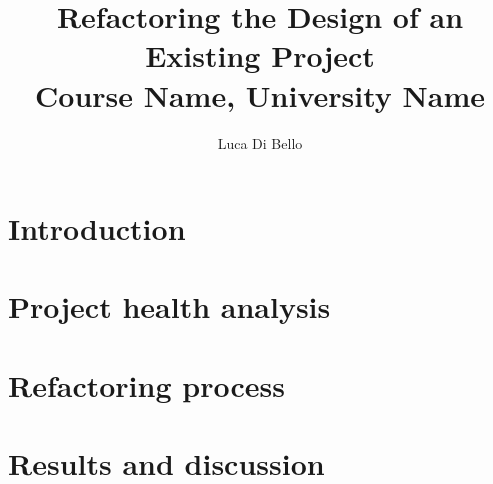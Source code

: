 \documentclass[a4paper, 11pt]{article}
\title{Refactoring the Design of an Existing Project \\\large Course Name, University Name}
\author{Luca Di Bello}
\date{\displaydate{today}}
\begin{document}
\maketitle

\section{Introduction}


\section{Project health analysis}
\label{sec:project_health_analysis}


\section{Refactoring process}
\label{sec:refactoring}


\section{Results and discussion}
\label{sec:results_conclusions}


\printbibliography
\end{document}
